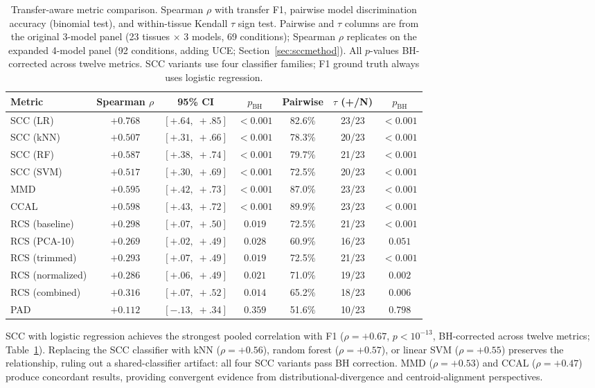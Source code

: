 \documentclass[11pt]{article}
\begin{document}
\begin{table}[t]
\centering
\caption{Transfer-aware metric comparison. Spearman $\rho$ with
transfer F1, pairwise model discrimination accuracy (binomial test),
and within-tissue Kendall $\tau$ sign test. Pairwise and $\tau$
columns are from the original 3-model panel (23 tissues $\times$ 3
models, 69 conditions); Spearman $\rho$ replicates on the expanded
4-model panel (92 conditions, adding UCE;
Section~\ref{sec:sccmethod}). All $p$-values BH-corrected across
twelve metrics. SCC variants use four classifier families; F1 ground
truth always uses logistic regression.}
\label{tab:scc}
\small
\begin{tabular}{@{}lcccccc@{}}
\toprule
Metric & Spearman $\rho$ & 95\% CI & $p_{\text{BH}}$ & Pairwise & $\tau$ (+/N) & $p_{\text{BH}}$ \\
\midrule
SCC (LR)         & $+0.768$ & $[+.64,\;+.85]$ & $<0.001$ & 82.6\% & 23/23 & $<0.001$ \\
SCC (kNN)        & $+0.507$ & $[+.31,\;+.66]$ & $<0.001$ & 78.3\% & 20/23 & $<0.001$ \\
SCC (RF)         & $+0.587$ & $[+.38,\;+.74]$ & $<0.001$ & 79.7\% & 21/23 & $<0.001$ \\
SCC (SVM)        & $+0.517$ & $[+.30,\;+.69]$ & $<0.001$ & 72.5\% & 20/23 & $<0.001$ \\
\midrule
MMD              & $+0.595$ & $[+.42,\;+.73]$ & $<0.001$ & 87.0\% & 23/23 & $<0.001$ \\
CCAL             & $+0.598$ & $[+.43,\;+.72]$ & $<0.001$ & 89.9\% & 23/23 & $<0.001$ \\
\midrule
RCS (baseline)   & $+0.298$ & $[+.07,\;+.50]$ & $0.019$  & 72.5\% & 21/23 & $<0.001$ \\
RCS (PCA-10)     & $+0.269$ & $[+.02,\;+.49]$ & $0.028$  & 60.9\% & 16/23 & $0.051$ \\
RCS (trimmed)    & $+0.293$ & $[+.07,\;+.49]$ & $0.019$  & 72.5\% & 21/23 & $<0.001$ \\
RCS (normalized) & $+0.286$ & $[+.06,\;+.49]$ & $0.021$  & 71.0\% & 19/23 & $0.002$ \\
RCS (combined)   & $+0.316$ & $[+.07,\;+.52]$ & $0.014$  & 65.2\% & 18/23 & $0.006$ \\
\midrule
PAD              & $+0.112$ & $[-.13,\;+.34]$ & $0.359$  & 51.6\% & 10/23 & $0.798$ \\
\bottomrule
\end{tabular}
\end{table}

SCC with logistic regression achieves the strongest pooled correlation
with F1 ($\rho = +0.67$, $p < 10^{-13}$, BH-corrected across twelve
metrics; Table~\ref{tab:scc}). Replacing the SCC classifier with
kNN ($\rho = +0.56$), random forest ($\rho = +0.57$), or linear SVM
($\rho = +0.55$) preserves the relationship, ruling out a shared-classifier
artifact: all four SCC variants pass BH correction.
MMD ($\rho = +0.53$) and CCAL ($\rho = +0.47$) produce concordant
results, providing convergent evidence from distributional-divergence
and centroid-alignment perspectives.
\end{document}

